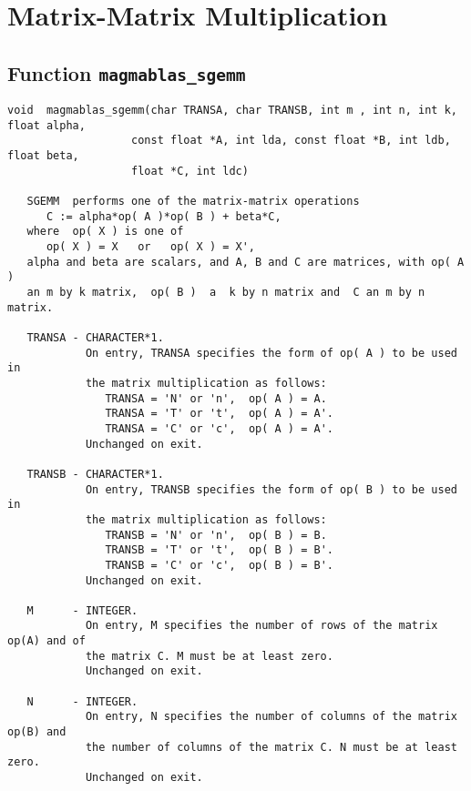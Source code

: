 \documentclass[10pt]{book}
\begin{document}
\newpage
\section{Matrix-Matrix Multiplication}

\newpage
\subsection{Function {\tt {\bf magmablas_sgemm}}}
\begin{verbatim}
void  magmablas_sgemm(char TRANSA, char TRANSB, int m , int n, int k, float alpha,
                   const float *A, int lda, const float *B, int ldb, float beta,
                   float *C, int ldc)

   SGEMM  performs one of the matrix-matrix operations
      C := alpha*op( A )*op( B ) + beta*C,
   where  op( X ) is one of
      op( X ) = X   or   op( X ) = X',
   alpha and beta are scalars, and A, B and C are matrices, with op( A )
   an m by k matrix,  op( B )  a  k by n matrix and  C an m by n matrix.
 
   TRANSA - CHARACTER*1.
            On entry, TRANSA specifies the form of op( A ) to be used in
            the matrix multiplication as follows:
               TRANSA = 'N' or 'n',  op( A ) = A.
               TRANSA = 'T' or 't',  op( A ) = A'.
               TRANSA = 'C' or 'c',  op( A ) = A'.
            Unchanged on exit.
 
   TRANSB - CHARACTER*1.
            On entry, TRANSB specifies the form of op( B ) to be used in
            the matrix multiplication as follows:
               TRANSB = 'N' or 'n',  op( B ) = B.
               TRANSB = 'T' or 't',  op( B ) = B'.
               TRANSB = 'C' or 'c',  op( B ) = B'.
            Unchanged on exit.
 
   M      - INTEGER.
            On entry, M specifies the number of rows of the matrix op(A) and of
            the matrix C. M must be at least zero.
            Unchanged on exit.
 
   N      - INTEGER.
            On entry, N specifies the number of columns of the matrix op(B) and
            the number of columns of the matrix C. N must be at least zero.
            Unchanged on exit.
 

\end{verbatim}
\end{document}

